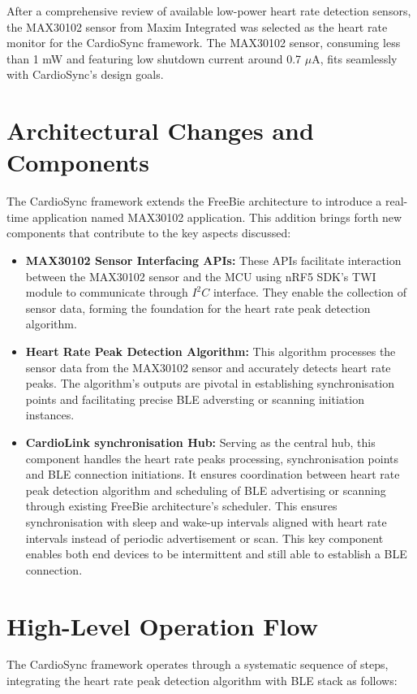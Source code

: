 \noindent After a comprehensive review of available low-power heart rate detection sensors, the MAX30102 sensor from Maxim Integrated was selected as the heart rate monitor for the CardioSync framework. The MAX30102 sensor, consuming less than 1 mW and featuring low shutdown current around 0.7 \(\mu\)A, fits seamlessly with CardioSync's design goals.

\section{Architectural Changes and Components}
The CardioSync framework extends the FreeBie architecture to introduce a real-time application named MAX30102 application. This addition brings forth new components that contribute to the key aspects discussed:

\begin{itemize}
    \item \textbf{MAX30102 Sensor Interfacing APIs:} These APIs facilitate interaction between the MAX30102 sensor and the MCU using nRF5 SDK's TWI module to communicate through \(I^2C\) interface. They enable the collection of sensor data, forming the foundation for the heart rate peak detection algorithm.
    
    \item \textbf{Heart Rate Peak Detection Algorithm:} This algorithm processes the sensor data from the MAX30102 sensor and accurately detects heart rate peaks. The algorithm's outputs are pivotal in establishing synchronisation points and facilitating precise BLE adversting or scanning initiation instances.
    
    \item \textbf{CardioLink synchronisation Hub:} Serving as the central hub, this component handles the heart rate peaks processing, synchronisation points and BLE connection initiations. It ensures coordination between heart rate peak detection algorithm and scheduling of BLE advertising or scanning through existing FreeBie architecture's scheduler. This ensures synchronisation with sleep and wake-up intervals aligned with heart rate intervals instead of periodic advertisement or scan. This key component enables both end devices to be intermittent and still able to establish a BLE connection.
    
\end{itemize}

\section{High-Level Operation Flow}
The CardioSync framework operates through a systematic sequence of steps, integrating the heart rate peak detection algorithm with BLE stack as follows:


